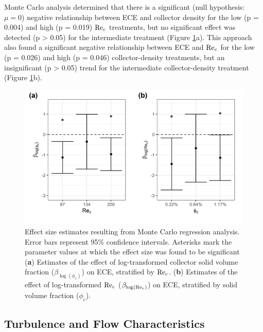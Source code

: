 \documentclass[geosciences,article,submit,moreauthors,pdftex]{Definitions/mdpi}
\begin{document}
Monte Carlo analysis determined that there is a significant (null hypothesis: $\mu = 0$) negative relationship between ECE and collector density for the low (p = 0.004) and high (p = 0.019) $\mathrm{Re}_c$ treatments, but no significant effect was detected (p > 0.05) for the intermediate treatment (Figure \ref{fig:monte}a). This approach also found a significant negative relationship between ECE and $\mathrm{Re}_c$ for the low (p = 0.026) and high (p = 0.046) collector-density treatments, but an insignificant (p > 0.05) trend for the intermediate collector-density treatment (Figure \ref{fig:monte}b). 

\begin{figure}[H]
\centering
\includegraphics[width=5in]{../pics/montecarlo.png}
\caption{Effect size estimates resulting from Monte Carlo regression analysis. Error bars represent 95\% confidence intervals. Asterisks mark the parameter values at which the effect size was found to be significant (\textbf{a}) Estimates of the effect of log-transformed collector solid volume fraction ($\beta_{\log(\phi_c)}$) on ECE, stratified by $\mathrm{Re}_c$. (\textbf{b}) Estimates of the effect of log-transformed $\mathrm{Re}_c$ ($\beta_{\log(\mathrm{Re}_c)}$) on ECE, stratified by solid volume fraction ($\phi_c$).}
\label{fig:monte}
\end{figure}   

\subsection{Turbulence and Flow Characteristics}
\end{document}
